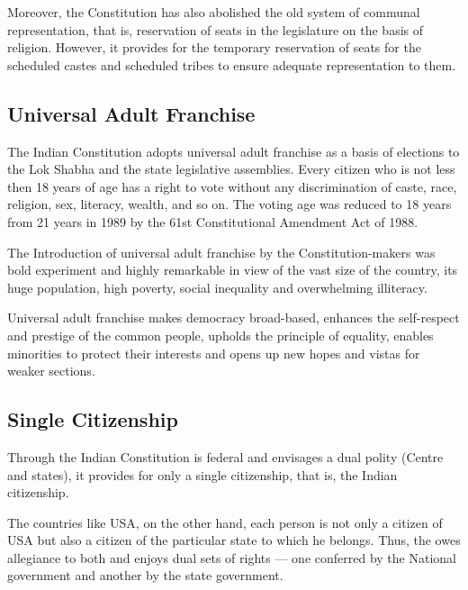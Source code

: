 \begin{multicol}{2}
Moreover, the Constitution has also abolished the old system of communal representation, that is, reservation of seats in the legislature on the basis of religion. However, it provides for the temporary reservation of seats for the scheduled castes and scheduled tribes to ensure adequate representation to them.

\subsection{Universal Adult Franchise}

The Indian Constitution adopts universal adult franchise as a basis of elections to the Lok Shabha and the state legislative assemblies. Every citizen who is not less then 18 years of age has a right to vote without any discrimination of caste, race, religion, sex, literacy, wealth, and so on. The voting age was reduced to 18 years from 21 years in 1989 by the 61st Constitutional Amendment Act of 1988.

The Introduction of universal adult franchise by the Constitution-makers was bold experiment and highly remarkable in view of the vast size of the country, its huge population, high poverty, social inequality and overwhelming illiteracy.

Universal adult franchise makes democracy broad-based, enhances the self-respect and prestige of the common people, upholds the principle of equality, enables minorities to protect their interests and opens up new hopes and vistas for weaker sections.

\subsection{Single Citizenship}

Through the Indian Constitution is federal and envisages a dual polity (Centre and states), it provides for only a single citizenship, that is, the Indian citizenship.

The countries like USA, on the other hand, each person is not only a citizen of USA but also a citizen of the particular state to which he belongs. Thus, the owes allegiance to both and enjoys dual sets of rights — one conferred by the National government and another by the state government.


\end{multicol}
